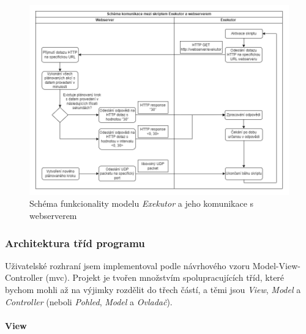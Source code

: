 \begin{figure}[h!]
    \centering
    \includegraphics[width=1\textwidth]{images/exekutor.png}
    \caption{Schéma funkcionality modelu \emph{Exekutor} a jeho komunikace s webserverem}
    \label{viewClasses}
\end{figure}

\subsubsection{Architektura tříd programu}

Uživatelské rozhraní jsem implementoval podle návrhového vzoru Model-View-Controller (\acrshort{mvc}). Projekt je tvořen množstvím spolupracujících tříd, které bychom mohli až na výjimky rozdělit do třech částí, a těmi jsou \emph{View}, \emph{Model} a \emph{Controller} (neboli \emph{Pohled}, \emph{Model} a \emph{Ovladač}).

\paragraph{View} \hfill


